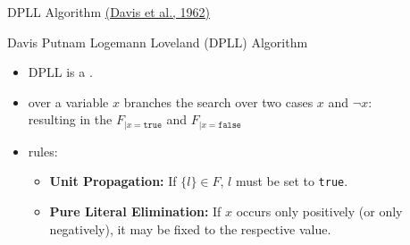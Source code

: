 \documentclass[t]{sdqbeamer}
\begin{document}
\begin{frame}{DPLL Algorithm \href{http://doi.acm.org/10.1145/368273.368557}{(Davis et al., 1962)}}

\begin{block}{Davis Putnam Logemann Loveland (DPLL) Algorithm}
\begin{itemize}\setlength{\itemsep}{1em}
\item DPLL is a .
\item {} over a variable $x$ branches the search over two cases $x$ and $\lnot x$:\\
resulting in the  $F_{|x=\texttt{true}}$ and $F_{|x=\texttt{false}}$
\item {} rules:
\begin{itemize}\setlength{\itemsep}{1ex}
	\item \textbf{Unit Propagation:}
	If $\{ l \} \in F$, $l$ must be set to \texttt{true}.
	\item  \textbf{Pure Literal Elimination:} If $x$ occurs only positively (or only negatively), it may be fixed to the respective value.
\end{itemize}
\end{itemize}
\end{block}
\end{frame}
\end{document}
